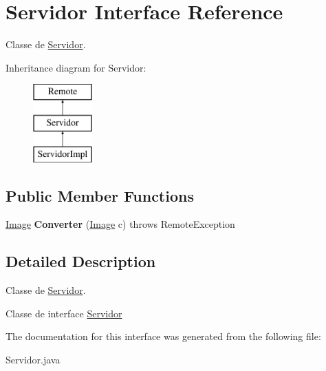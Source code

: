 \hypertarget{interfaceServidor}{\section{Servidor Interface Reference}
\label{interfaceServidor}
}


Classe de \hyperlink{interfaceServidor}{Servidor}.  


Inheritance diagram for Servidor\-:\begin{figure}[H]
\begin{center}
\leavevmode
\includegraphics[height=3.000000cm]{interfaceServidor}
\end{center}
\end{figure}
\subsection*{Public Member Functions}
\begin{DoxyCompactItemize}
\item 
\hypertarget{interfaceServidor_a845e4c445fc700fa0a76a878dbe27ff5}{\hyperlink{classImage}{Image} {\bfseries Converter} (\hyperlink{classImage}{Image} c)  throws Remote\-Exception}\label{interfaceServidor_a845e4c445fc700fa0a76a878dbe27ff5}

\end{DoxyCompactItemize}


\subsection{Detailed Description}
Classe de \hyperlink{interfaceServidor}{Servidor}. 

Classe de interface \hyperlink{interfaceServidor}{Servidor} 

The documentation for this interface was generated from the following file\-:\begin{DoxyCompactItemize}
\item 
Servidor.\-java\end{DoxyCompactItemize}
